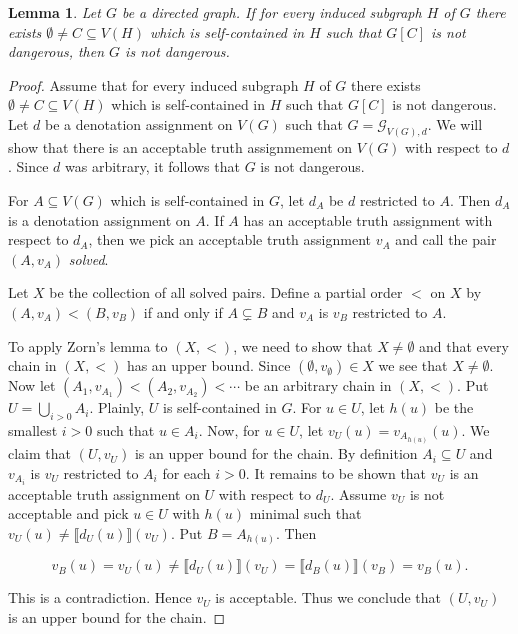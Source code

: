 \documentclass[12pt]{article}
\newtheorem{lem}[thm]{Lemma}
\theoremstyle{remark}
\newcommand{\fancy}[1]{\mathcal{#1}}
\def\G{\fancy{G}}
\begin{document}
\begin{lem}\label{GeneralZorn}
Let $G$ be a directed graph. If for every induced subgraph $H$ of $G$ there exists $\emptyset \neq C \subseteq V(H)$ which is self-contained in $H$ such that $G[C]$ is not dangerous, then $G$ is not dangerous.
\end{lem}
\begin{proof}
Assume that for every induced subgraph $H$ of $G$ there exists $\emptyset \neq C \subseteq V(H)$ which is self-contained in $H$ such that $G[C]$ is not dangerous.  Let $d$ be a denotation assignment on $V(G)$ such that $G = \G_{V(G), d}$. We will show that there is an acceptable truth assignmement on $V(G)$ with respect to $d$.  Since $d$ was arbitrary, it follows that $G$ is not dangerous.\newline

For $A \subseteq V(G)$ which is self-contained in $G$, let $d_A$ be $d$ restricted to $A$.  Then $d_A$ is a denotation assignment on $A$.  If $A$ has an  acceptable truth assignment with respect to $d_A$, then we pick an acceptable truth assignment $v_A$ and call the pair $(A, v_A)$ \emph{solved}.\newline

Let $X$ be the collection of all solved pairs.  Define a partial order $<$ on $X$ by $(A, v_A) < (B, v_B)$ if and only if $A \subsetneq B$ and $v_A$ is $v_B$ restricted to $A$.\newline

To apply Zorn's lemma to $(X, <)$, we need to show that $X \neq \emptyset$ and that every chain in  $(X, <)$ has an upper bound. Since $(\emptyset, v_\emptyset) \in X$ we see that $X \neq \emptyset$.  Now let $(A_1, v_{A_1}) < (A_2, v_{A_2}) < \cdots$ be an arbitrary chain in $(X, <)$.  Put $U = \bigcup_{i > 0} A_i$. Plainly, $U$ is self-contained in $G$. For $u \in U$, let $h(u)$ be the smallest $i > 0$ such that $u \in A_i$.  Now, for $u \in U$, let $v_U(u) = v_{A_{h(u)}}(u)$.  We claim that $(U, v_U)$ is an upper bound for the chain.  By definition $A_i \subseteq U$ and $v_{A_i}$ is $v_U$ restricted to $A_i$ for each $i > 0$.  It remains to be shown that $v_U$ is an acceptable truth assignment on $U$ with respect to $d_U$.  Assume $v_U$ is not acceptable and pick $u \in U$ with $h(u)$ minimal such that $v_U(u) \neq \llbracket d_U(u)\rrbracket(v_U)$.  Put $B = A_{h(u)}$. Then

\[v_B(u) = v_U(u) \neq \llbracket d_U(u)\rrbracket(v_U) = \llbracket d_B(u)\rrbracket(v_B) = v_B(u).\]

This is a contradiction.  Hence $v_U$ is acceptable.  Thus we conclude that $(U, v_U)$ is an upper bound for the chain.\newline


\end{proof}
\end{document}
